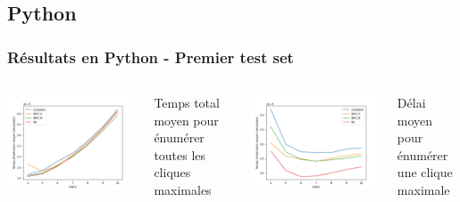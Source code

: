\documentclass{beamer}
\begin{document}
\subsection{Python}
\begin{frame}
  \frametitle{Résultats en Python - Premier test set}
  \begin{columns}
      \centering
      \includegraphics[width=\textwidth]{images/total_plot.png}
      \caption{Temps total moyen pour énumérer toutes les cliques maximales}
      \centering
      \includegraphics[width=\textwidth]{images/delay_plot.png}
      \caption{Délai moyen pour énumérer une clique maximale}
  \end{columns}
\end{frame}
\end{document}
